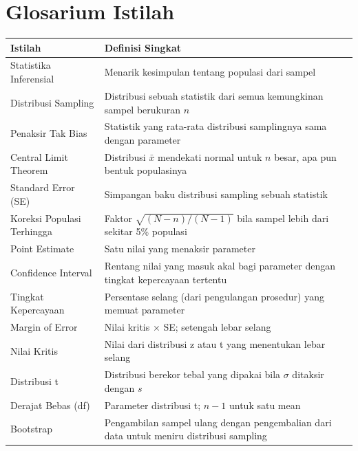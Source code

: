 \documentclass[
  indonesian,
  letterpaper,
]{book}
\newcounter{none} %
\begin{document}
\section{Glosarium Istilah}\label{glosarium-istilah}

{\def\LTcaptype{none} %
\begin{longtable}[]{@{}
  >{\raggedright\arraybackslash}p{}
  >{\raggedright\arraybackslash}p{}@{}}
\toprule\noalign{}
\begin{minipage}[b]{\linewidth}\raggedright
Istilah
\end{minipage} & \begin{minipage}[b]{\linewidth}\raggedright
Definisi Singkat
\end{minipage} \\
\midrule\noalign{}
\endhead
\bottomrule\noalign{}
\endlastfoot
Statistika Inferensial & Menarik kesimpulan tentang populasi dari
sampel \\
Distribusi Sampling & Distribusi sebuah statistik dari semua kemungkinan
sampel berukuran \(n\) \\
Penaksir Tak Bias & Statistik yang rata-rata distribusi samplingnya sama
dengan parameter \\
Central Limit Theorem & Distribusi \(\bar{x}\) mendekati normal untuk
\(n\) besar, apa pun bentuk populasinya \\
Standard Error (SE) & Simpangan baku distribusi sampling sebuah
statistik \\
Koreksi Populasi Terhingga & Faktor \(\sqrt{(N-n)/(N-1)}\) bila sampel
lebih dari sekitar 5\% populasi \\
Point Estimate & Satu nilai yang menaksir parameter \\
Confidence Interval & Rentang nilai yang masuk akal bagi parameter
dengan tingkat kepercayaan tertentu \\
Tingkat Kepercayaan & Persentase selang (dari pengulangan prosedur) yang
memuat parameter \\
Margin of Error & Nilai kritis × SE; setengah lebar selang \\
Nilai Kritis & Nilai dari distribusi z atau t yang menentukan lebar
selang \\
Distribusi t & Distribusi berekor tebal yang dipakai bila \(\sigma\)
ditaksir dengan \(s\) \\
Derajat Bebas (df) & Parameter distribusi t; \(n-1\) untuk satu mean \\
Bootstrap & Pengambilan sampel ulang dengan pengembalian dari data untuk
meniru distribusi sampling \\
\end{longtable}
}
\end{document}
